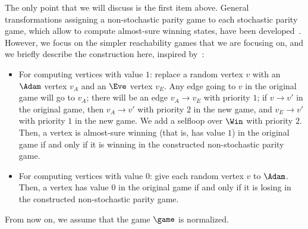 The only point that we will discuss is the first item above. General
transformations assigning a non-stochastic parity game to each
stochastic parity game, which allow to compute almost-sure winning
states, have been developed~\cite{CJH-csl03}.
However, we focus on the simpler reachability
games that we are focusing on, and we briefly describe the
construction here, inspired by~\cite{paulin-nathalie}:
\begin{itemize}
\item For computing vertices with value $1$: replace a random vertex
$v$ with an $\Adam$ vertex $v_A$ and an $\Eve$ vertex $v_E$. Any edge
going to $v$ in the original game will go to $v_A$; there will be an
edge $v_A \to v_E$ with priority $1$; if $v \to v'$ in the original
game, then $v_A \to v'$ with priority $2$ in the new game, and $v_E
\to v'$ with priority $1$ in the new game. We add a selfloop over
$\Win$ with priority $2$. Then, a vertex is almost-sure winning
(that is, has value $1$) in the original game if and only if it is
winning in the constructed non-stochastic parity game.
\item For computing vertices with value $0$: give each random vertex
$v$ to $\Adam$. Then, a vertex has value $0$ in the original game if
and only if it is losing in the constructed non-stochastic parity
game.
\end{itemize}





From now on, we assume that the game $\game$ is normalized.


